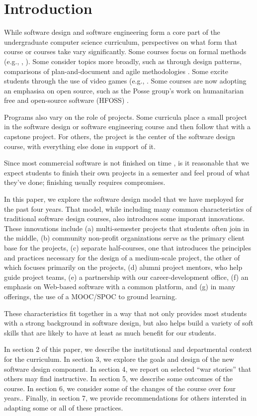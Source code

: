 
\section{Introduction}

While software design and software engineering form a core part of
the undergraduate computer science curriculum, perspectives on what
form that course or courses take vary significantly.  Some courses
focus on formal methods (e.g., \cite{liu-2009}, \cite{gracia-2014}).
Some consider topics more broadly, such as through design patterns,
comparisons of plan-and-document and agile methodologies
\cite{gestwicki-2018}.  Some excite students through the use of
video games (e.g., \cite{wolz-2007}.  Some courses are now adopting
an emphasisa on open source, such as the Posse group's work on
humanitarian free and open-source software (HFOSS) \cite{hfoss-2018}.

Programs also vary on the role of projects.  Some curricula place
a small project in the software design or software engineering
course and then follow that with a capstone project.  For others,
the project is the center of the software design course, with
everything else done in support of it.

Since most commercial software is not finished on time \cite{fox-2014},
is it reasonable that we expect students to finish their own projects
in a semester and feel proud of what they've done; finishing usually
requires compromises.

In this paper, we explore the software design model that we have
meployed for the past four years.  That model, while including many
common characteristics of traditional software design courses, also
introduces some imporant innovations.  These innovations include
(a) multi-semester projects that students often join in the middle,
(b) community non-profit organizations serve as the primary client
base for the projects, (c) separate half-courses, one that introduces
the principles and practices necessary for the design of a medium-scale
project, the other of which focuses primarily on the projects, (d)
alumni project mentors, who help guide project teams, (e) a partnership
with our career-development office, (f) an emphasis on Web-based
software with a common platform, and (g) in many offerings, the use
of a MOOC/SPOC to ground learning.

These characteristics fit together in a way that not only provides
most students with a strong background in software design, but also
helps build a variety of soft skills that are likely to have at
least as much benefit for our students.

In section 2 of this paper, we describe the institutional and
departmental context for the curriculum.  In section 3, we explore
the goals and design of the new software design component.  In
section 4, we report on selected ``war stories'' that others may
find instructive.  In section 5, we describe some outcomes of the
course.  In section 6, we consider some of the changes of the course
over four years..  Finally, in section 7, we provide recommendations
for others intersted in adapting some or all of these practices.

